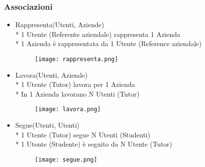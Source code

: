 \documentclass[12pt]{article}
\begin{document}
\subsubsection{Associazioni}
\begin{itemize}
    \item Rappresenta(Utenti, Aziende)\\*
    1 Utente (Referente aziendale) rappresenta 1 Azienda\\*
    1 Azienda è rappresentata da 1 Utente (Reference aziendale)
    \begin{figure}[h]
        \begin{center}
        \texttt{[image: rappresenta.png]}
        \end{center}
    \end{figure}
    \item Lavora(Utenti, Aziende)\\*
    1 Utente (Tutor) lavora per 1 Azienda\\*
    In 1 Azienda lavorano N Utenti (Tutor)
    \begin{figure}[h]
        \begin{center}
        \texttt{[image: lavora.png]}
        \end{center}
    \end{figure}
    \item Segue(Utenti, Utenti)\\*
    1 Utente (Tutor) segue N Utenti (Studenti)\\*
    1 Utente (Studente) è seguito da N Utente (Tutor)
    \begin{figure}[h]
        \begin{center}
        \texttt{[image: segue.png]}
        \end{center}
    \end{figure}
    
    \newpage
    

\end{itemize}
\end{document}
